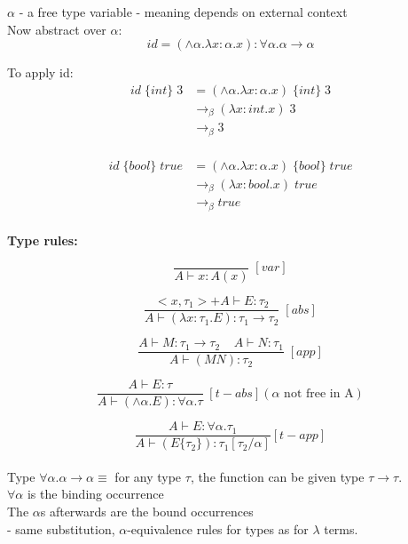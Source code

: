 \documentclass[11pt]{article}
\begin{document}
$\alpha$ - a free type variable - meaning depends on external context \\

Now abstract over $\alpha$: \\

$$id = (\land \alpha.\lambda x:\alpha.x) : \forall \alpha.\alpha \rightarrow \alpha$$

To apply id: 
\begin{align*}
id\;\{int\}\;3 &= (\land \alpha. \lambda x:\alpha.x)\;\{int\}\;3 \\
&\rightarrow_\beta (\lambda x:int.x)\;3 \\
&\rightarrow_\beta 3 \\
\end{align*}

\begin{align*}
id\;\{bool\}\;true &= (\land \alpha. \lambda x:\alpha.x)\;\{bool\}\;true \\
&\rightarrow_\beta (\lambda x:bool.x)\;true \\
&\rightarrow_\beta true \\
\end{align*}

{\bf Type rules:} 

$$\frac{}{A \vdash x:A(x)}\;[var]$$

$$\frac{<x,\tau_1> + A \vdash E:\tau_2}{A \vdash (\lambda x:\tau_1.E):\tau_1 \rightarrow \tau_2}\;[abs]$$

$$\frac{A \vdash M:\tau_1 \rightarrow \tau_2 \;\;\;\; A \vdash N:\tau_1}{A \vdash (MN):\tau_2}\;[app]$$

$$\frac{A \vdash E:\tau}{A \vdash (\land \alpha.E):\forall \alpha.\tau}\;[t-abs](\alpha \text{ not free in A})$$

$$\frac{A \vdash E: \forall \alpha.\tau_1}{A \vdash (E \{\tau_2\}):\tau_1[\tau_2/\alpha]}[t-app]$$ \\

Type $\forall \alpha.\alpha \rightarrow \alpha \equiv$ for any type $\tau$, the function can be given type $\tau \rightarrow \tau$. \\

$\forall \alpha$ is the binding occurrence \\

The $\alpha$s afterwards are the bound occurrences \\

- same substitution, $\alpha$-equivalence rules for types as for $\lambda$ terms. \\
\end{document}
